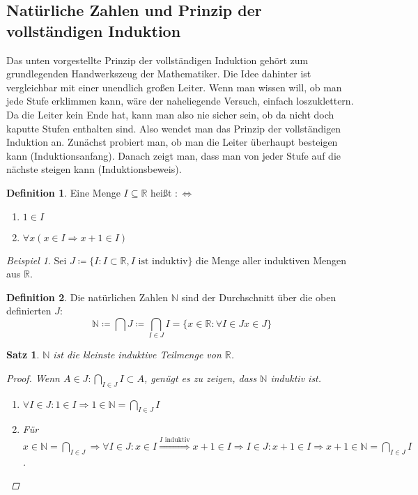 \documentclass[ngerman,titlepage,twoside, parskip=half*]{scrreprt}
\newcommand*{\N}{\mathbb{N}}
\newcommand*{\R}{\mathbb{R}}
\newcommand*{\perdef}{:\Leftrightarrow}
\theoremstyle{plain}
\newtheorem{theorem}{Satz}[section]
\theoremstyle{definition}
\newtheorem{definition}{Definition}
\theoremstyle{remark}
\newtheorem*{beispiel}{Beispiel}
\newcommand*{\highl}[2][]{\textbf{\boldmath{#2}}%
  \ifthenelse{\equal{#1}{}}{\index{#2}}{\index{#1}}%
}
\begin{document}
\subsection{Natürliche Zahlen und Prinzip der vollständigen Induktion}
Das unten vorgestellte Prinzip der vollständigen Induktion gehört zum
grundlegenden Handwerkszeug der Mathematiker. Die Idee dahinter ist
vergleichbar mit einer unendlich großen Leiter. Wenn man wissen will, ob man
jede Stufe erklimmen kann, wäre der naheliegende Versuch, einfach
loszuklettern. Da die Leiter kein Ende hat, kann man also nie sicher sein, ob
da nicht doch kaputte Stufen enthalten sind. Also wendet man das Prinzip der
vollständigen Induktion an. Zunächst probiert man, ob man die Leiter überhaupt
besteigen kann (Induktionsanfang). Danach zeigt man, dass man von jeder Stufe
auf die nächste steigen kann (Induktionsbeweis).

\begin{definition}
  Eine Menge $I \subseteq \R$ heißt \highl{induktiv}$\perdef$
  \begin{enumerate}
  \item $1 \in I$
  \item $\forall x (x \in I \Rightarrow x+1 \in I)$
  \end{enumerate}
\end{definition}

\begin{beispiel}
  Sei $J\coloneqq\{I\colon I \subset \R, I \text{ ist induktiv}\}$ die
  Menge aller induktiven Mengen aus $\R$.
\end{beispiel}

\begin{definition}
  Die natürlichen Zahlen $\N$ sind der Durchschnitt über die oben definierten
  $J$:
  \[\N \coloneqq \bigcap J \coloneqq \bigcap_{I \in J} I = \{x \in \R \colon
  \forall I \in J x \in J\}\]
\end{definition}

\begin{theorem}
  $\N$ ist die kleinste induktive Teilmenge von $\R$.
\begin{proof}
Wenn $A \in J \colon \bigcap_{I \in J} I \subset A$, genügt es zu zeigen,
dass $\N$  induktiv ist.
\begin{enumerate}
\item $\forall I \in J \colon 1 \in I \Rightarrow 1 \in \N = \bigcap_{I \in
    J} I$
\item Für $x \in \N = \bigcap_{I \in J} \Rightarrow \forall I \in J \colon x
  \in I \stackrel{I \text{ induktiv}}{\Longrightarrow} x+1 \in I\Rightarrow I
  \in J \colon x+1 \in I \Rightarrow x+1 \in \N = \bigcap_{I \in J} I$.
\end{enumerate}
\end{proof}
\end{theorem}
\end{document}
